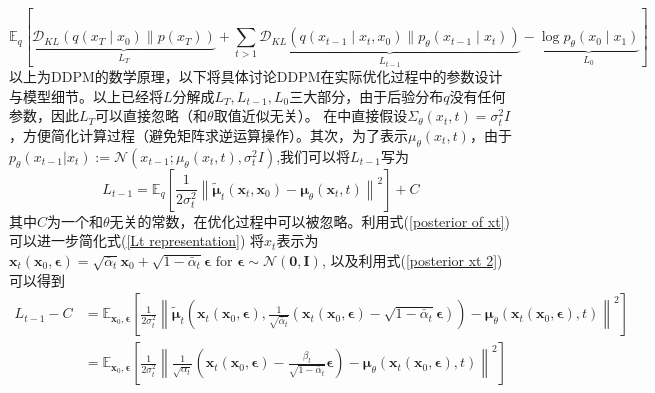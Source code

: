 \begin{equation}
\mathbb{E}_q[\underbrace{\mathcal{D}_{K L}\left(q\left(x_T \mid x_0\right) \| p\left(x_T\right)\right)}_{L_T}+\sum_{t>1} \underbrace{\mathcal{D}_{K L}\left(q\left(x_{t-1} \mid x_t, x_0\right) \| p_\theta\left(x_{t-1} \mid x_t\right)\right)}_{L_{t-1}}-\underbrace{\log p_\theta\left(x_0 \mid x_1\right)}_{L_0}]
    \end{equation}
以上为DDPM的数学原理，以下将具体讨论DDPM在实际优化过程中的参数设计与模型细节。以上已经将$L$分解成$L_T,L_{t-1},L_0$三大部分，由于后验分布$q$没有任何参数，因此$L_T$可以直接忽略（和$\theta$取值近似无关）。
在\cite{DDPM}中直接假设$\Sigma_{\theta}(x_t,t)=\sigma_t^2 I$，方便简化计算过程（避免矩阵求逆运算操作）。其次，为了表示$\mu_{\theta}(x_t,t)$，由于$p_{\theta}(x_{t-1}|x_t):= \mathcal{N}(x_{t-1};\mu_{\theta}(x_t,t),\sigma_t^2I)$,我们可以将$L_{t-1}$写为
\begin{equation}
    L_{t-1}=\mathbb{E}_q\left[\frac{1}{2 \sigma_t^2}\left\|\tilde{\boldsymbol{\mu}}_t\left(\mathbf{x}_t, \mathbf{x}_0\right)-\boldsymbol{\mu}_\theta\left(\mathbf{x}_t, t\right)\right\|^2\right]+C
    \label{Lt representation}
\end{equation}
其中$C$为一个和$\theta$无关的常数，在优化过程中可以被忽略。利用式(\ref{posterior of xt})可以进一步简化式(\ref{Lt representation}) 将$x_t$表示为$\mathbf{x}_t\left(\mathbf{x}_0, \boldsymbol{\epsilon}\right)=\sqrt{\bar{\alpha}_t} \mathbf{x}_0+\sqrt{1-\bar{\alpha}_t} \boldsymbol{\epsilon} \text { for } \boldsymbol{\epsilon} \sim \mathcal{N}(\mathbf{0}, \mathbf{I}) $, 以及利用式(\ref{posterior xt 2})可以得到
\begin{align}
    L_{t-1}-C&=\mathbb{E}_{\mathbf{x}_0, \boldsymbol{\epsilon}}\left[\frac{1}{2 \sigma_t^2}\left\|\tilde{\boldsymbol{\mu}}_t\left(\mathbf{x}_t\left(\mathbf{x}_0, \boldsymbol{\epsilon}\right), \frac{1}{\sqrt{\bar{\alpha}_t}}\left(\mathbf{x}_t\left(\mathbf{x}_0, \boldsymbol{\epsilon}\right)-\sqrt{1-\bar{\alpha}_t} \boldsymbol{\epsilon}\right)\right)-\boldsymbol{\mu}_\theta\left(\mathbf{x}_t\left(\mathbf{x}_0, \boldsymbol{\epsilon}\right), t\right)\right\|^2\right]\\
&=\mathbb{E}_{\mathbf{x}_0, \boldsymbol{\epsilon}}\left[\frac{1}{2 \sigma_t^2}\left\|\frac{1}{\sqrt{\alpha_t}}\left(\mathbf{x}_t\left(\mathbf{x}_0, \boldsymbol{\epsilon}\right)-\frac{\beta_t}{\sqrt{1-\bar{\alpha}_t}} \boldsymbol{\epsilon}\right)-\boldsymbol{\mu}_\theta\left(\mathbf{x}_t\left(\mathbf{x}_0, \boldsymbol{\epsilon}\right), t\right)\right\|^2\right]
\end{align}
